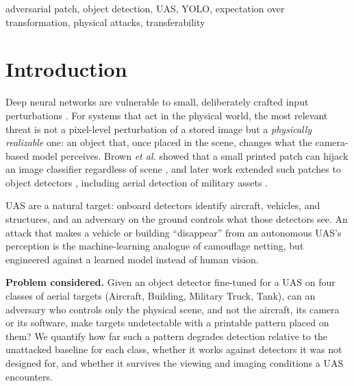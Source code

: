 \documentclass[conference]{IEEEtran}
\begin{document}
\begin{IEEEkeywords}
adversarial patch, object detection, UAS, YOLO, expectation over transformation,
physical attacks, transferability
\end{IEEEkeywords}

\section{Introduction}
Deep neural networks are vulnerable to small, deliberately crafted input perturbations
\cite{szegedy2014intriguing,goodfellow2015explaining}. For systems that act in the physical
world, the most relevant threat is not a pixel-level perturbation of a stored image but a
\emph{physically realizable} one: an object that, once placed in the scene, changes what the
camera-based model perceives. Brown \emph{et al.} showed that a small printed patch can
hijack an image classifier regardless of scene \cite{brown2017adversarial}, and later work
extended such patches to object detectors \cite{lee2019physical,thys2019fooling}, including
aerial detection of military assets \cite{denhollander2020adversarial}.

UAS are a natural target: onboard detectors identify aircraft, vehicles, and structures, and
an adversary on the ground controls what those detectors see. An attack that makes a vehicle
or building ``disappear'' from an autonomous UAS's perception is the machine-learning analogue
of camouflage netting, but engineered against a learned model instead of human vision.

\textbf{Problem considered.} Given an object detector fine-tuned for a UAS on four classes of
aerial targets (Aircraft, Building, Military Truck, Tank), can an adversary who controls only
the physical scene, and not the aircraft, its camera or its software, make targets undetectable
with a printable pattern placed on them? We quantify how far such a pattern degrades detection
relative to the unattacked baseline for each class, whether it works against detectors it was
not designed for, and whether it survives the viewing and imaging conditions a UAS encounters.
\end{document}
